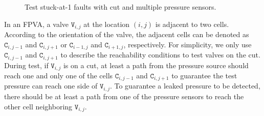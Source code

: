 \begin{figure}
{\figurefontsize
\centering

\caption{Test stuck-at-1 faults with cut and multiple pressure sensors.}
\label{fig:multi_port_cut_theorem}
}
\end{figure}

In an FPVA, a valve $\mathtt{V}_{i,j}$ at the location $(i,j)$ is adjacent to two cells.
According to the orientation of the valve, the adjacent cells 
can be denoted as $\mathtt{C}_{i,j-1}$ and $\mathtt{C}_{i,j+1}$ or
$\mathtt{C}_{i-1,j}$ and $\mathtt{C}_{i+1,j}$, respectively.
For simplicity, we only use
$\mathtt{C}_{i,j-1}$ and $\mathtt{C}_{i,j+1}$ to describe the reachability
conditions to test valves on the cut.
During test, if $\mathtt{V}_{i,j}$ is on a cut, 
at least a path from the pressure source should reach one and only one of the
cells
$\mathtt{C}_{i,j-1}$ and $\mathtt{C}_{i,j+1}$ to guarantee the test pressure
can reach one side of $\mathtt{V}_{i,j}$. To guarantee a leaked pressure to be
detected, there should be at least a path from one of the pressure sensors to reach
the other cell neighboring $\mathtt{V}_{i,j}$.


